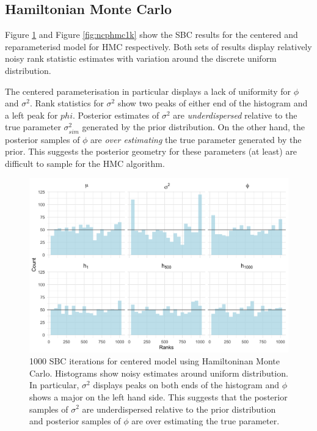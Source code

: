 \documentclass[12pt, a4paper]{article}
\begin{document}
    \subsection{Hamiltonian Monte Carlo}
    Figure \ref{fig:cphmc1k} and Figure \ref{fig:ncphmc1k} show the SBC results for the centered and reparameterisd model for HMC respectively. Both sets of results display relatively noisy rank statistic estimates with variation around the discrete uniform distribution.

    The centered parameterisation in particular displays a lack of uniformity for $\phi$ and $\sigma^2$. Rank statistics for $\sigma^2$ show two peaks of either end of the histogram and a left peak for $phi$. Posterior estimates of $\sigma^2$ are \textit{underdispersed} relative to the true parameter $\sigma^2_{sim}$ generated by the prior distribution. On the other hand, the posterior samples of $\phi$ are \textit{over estimating} the true parameter generated by the prior. This suggests the posterior geometry for these parameters (at least) are difficult to sample for the HMC algorithm.

    \begin{figure}[H]
        \centering
        \includegraphics[scale=0.09]{results/hmc_cp_1k.png}
        \caption{1000 SBC iterations for centered model using Hamiltoninan Monte Carlo. Histograms show noisy estimates around uniform distribution. In particular, $\sigma^2$ displays peaks on both ends of the histogram and $\phi$ shows a major on the left hand side. This suggests that the posterior samples of $\sigma^2$ are underdispersed relative to the prior distribution and posterior samples of $\phi$ are over estimating the true parameter.}
        \label{fig:cphmc1k}
    \end{figure}
\end{document}

